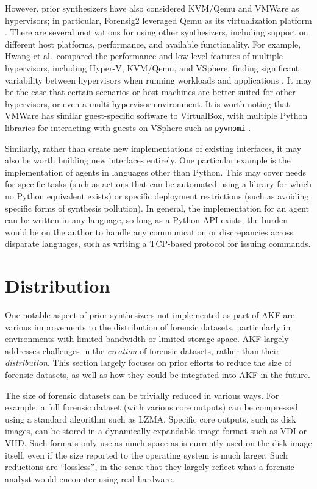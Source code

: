 \documentclass[letterpaper,12pt]{report}
\newcommand{\passthrough}[1]{#1}
\begin{document}
However, prior synthesizers have also considered KVM/Qemu and VMWare as
hypervisors; in particular, Forensig2 leveraged Qemu as its
virtualization platform \cite{mochForensicImageGenerator2009}. There
are several motivations for using other synthesizers, including support
on different host platforms, performance, and available functionality.
For example, Hwang et al.~compared the performance and low-level
features of multiple hypervisors, including Hyper-V, KVM/Qemu, and
VSphere, finding significant variability between hypervisors when
running workloads and applications
\cite{hwangComponentbasedPerformanceComparison2013}. It may be the
case that certain scenarios or host machines are better suited for other
hypervisors, or even a multi-hypervisor environment. It is worth noting
that VMWare has similar guest-specific software to VirtualBox, with
multiple Python libraries for interacting with guests on VSphere such as
\passthrough{\lstinline!pyvmomi!} \cite{VmwarePyvmomi2025}.

Similarly, rather than create new implementations of existing
interfaces, it may also be worth building new interfaces entirely. One
particular example is the implementation of agents in languages other
than Python. This may cover needs for specific tasks (such as actions
that can be automated using a library for which no Python equivalent
exists) or specific deployment restrictions (such as avoiding specific
forms of synthesis pollution). In general, the implementation for an
agent can be written in any language, so long as a Python API exists;
the burden would be on the author to handle any communication or
discrepancies across disparate languages, such as writing a TCP-based
protocol for issuing commands.

\section{Distribution}\label{distribution}

One notable aspect of prior synthesizers not implemented as part of AKF
are various improvements to the distribution of forensic datasets,
particularly in environments with limited bandwidth or limited storage
space. AKF largely addresses challenges in the \emph{creation} of
forensic datasets, rather than their \emph{distribution}. This section
largely focuses on prior efforts to reduce the size of forensic
datasets, as well as how they could be integrated into AKF in the
future.

The size of forensic datasets can be trivially reduced in various ways.
For example, a full forensic dataset (with various core outputs) can be
compressed using a standard algorithm such as LZMA. Specific core
outputs, such as disk images, can be stored in a dynamically expandable
image format such as VDI or VHD. Such formats only use as much space as
is currently used on the disk image itself, even if the size reported to
the operating system is much larger. Such reductions are ``lossless'',
in the sense that they largely reflect what a forensic analyst would
encounter using real hardware.
\end{document}
